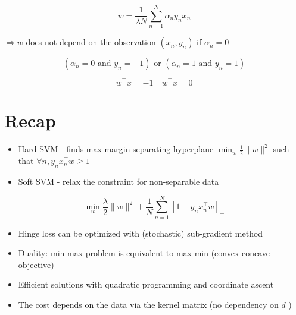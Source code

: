 \documentclass[10pt]{article}
\begin{document}
$$
w=\frac{1}{\lambda N} \sum_{n=1}^{N} \alpha_{n} y_{n} x_{n}
$$

$\Rightarrow w$ does not depend on the observation $\left(x_{n}, y_{n}\right)$ if $\alpha_{n}=0$

$$
\left(\alpha_{n}=0 \text { and } y_{n}=-1\right) \text { or }\left(\alpha_{n}=1 \text { and } y_{n}=1\right)
$$

$$
w^{\top} x=-1 \quad w^{\top} x=0
$$

\section*{Recap}
\begin{itemize}
  \item Hard SVM - finds max-margin separating hyperplane $\min _{w} \frac{1}{2}\|w\|^{2}$ such that $\forall n, y_{n} x_{n}^{\top} w \geq 1$

  \item Soft SVM - relax the constraint for non-separable data

\end{itemize}

$$
\min _{w} \frac{\lambda}{2}\|w\|^{2}+\frac{1}{N} \sum_{n=1}^{N}\left[1-y_{n} x_{n}^{\top} w\right]_{+}
$$

\begin{itemize}
  \item Hinge loss can be optimized with (stochastic) sub-gradient method

  \item Duality: min max problem is equivalent to max min (convex-concave objective)

  \item Efficient solutions with quadratic programming and coordinate ascent

  \item The cost depends on the data via the kernel matrix (no dependency on $d$ )

\end{itemize}
\end{document}
